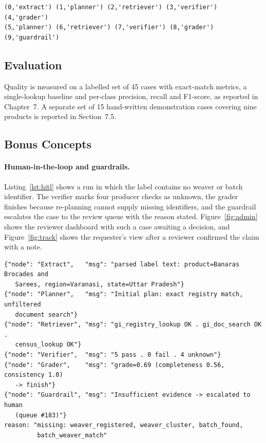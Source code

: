 \begin{lstlisting}[language={},caption={Checkpoint rows (step, node) stored for case REPORT-TRACE-1},label={lst:ckpt}]
(0,'extract') (1,'planner') (2,'retriever') (3,'verifier') (4,'grader')
(5,'planner') (6,'retriever') (7,'verifier') (8,'grader') (9,'guardrail')
\end{lstlisting}

\subsection{Evaluation}

Quality is measured on a labelled set of 45 cases with exact-match metrics, a single-lookup baseline
and per-class precision, recall and F1-score, as reported in Chapter~7. A separate set of 15
hand-written demonstration cases covering nine products is reported in Section~7.5.

\subsection{Bonus Concepts}

\paragraph{Human-in-the-loop and guardrails.} Listing~\ref{lst:hitl} shows a run in which the label
contains no weaver or batch identifier. The verifier marks four producer checks as unknown, the grader
finishes because re-planning cannot supply missing identifiers, and the guardrail escalates the case to
the review queue with the reason stated. Figure~\ref{fig:admin} shows the reviewer dashboard with such
a case awaiting a decision, and Figure~\ref{fig:track} shows the requester's view after a reviewer
confirmed the claim with a note.

\begin{lstlisting}[language={},caption={Trace of an abstention and escalation (case REPORT-TRACE-2)},label={lst:hitl}]
{"node": "Extract",   "msg": "parsed label text: product=Banaras Brocades and
   Sarees, region=Varanasi, state=Uttar Pradesh"}
{"node": "Planner",   "msg": "Initial plan: exact registry match, unfiltered
   document search"}
{"node": "Retriever", "msg": "gi_registry_lookup OK . gi_doc_search OK .
   census_lookup OK"}
{"node": "Verifier",  "msg": "5 pass . 0 fail . 4 unknown"}
{"node": "Grader",    "msg": "grade=0.69 (completeness 0.56, consistency 1.0)
   -> finish"}
{"node": "Guardrail", "msg": "Insufficient evidence -> escalated to human
   (queue #183)"}
reason: "missing: weaver_registered, weaver_cluster, batch_found,
         batch_weaver_match"
\end{lstlisting}

